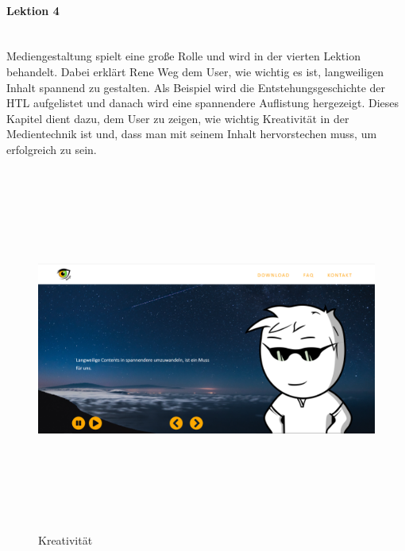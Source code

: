 \paragraph{Lektion 4} \leavevmode \\
Mediengestaltung spielt eine große Rolle und wird in der vierten Lektion behandelt. Dabei erklärt Rene Weg dem User, wie wichtig es ist, langweiligen Inhalt spannend zu gestalten. Als Beispiel wird die Entstehungsgeschichte der HTL aufgelistet und danach wird eine spannendere Auflistung hergezeigt. Dieses Kapitel dient dazu, dem User zu zeigen, wie wichtig Kreativität in der Medientechnik ist und, dass man mit seinem Inhalt hervorstechen muss, um erfolgreich zu sein.
\begin{figure} [h]
	\centering
\includegraphics[width=12cm,height=12cm,keepaspectratio]{webseite_abb15} 
	\caption{Kreativität}
\end{figure}
